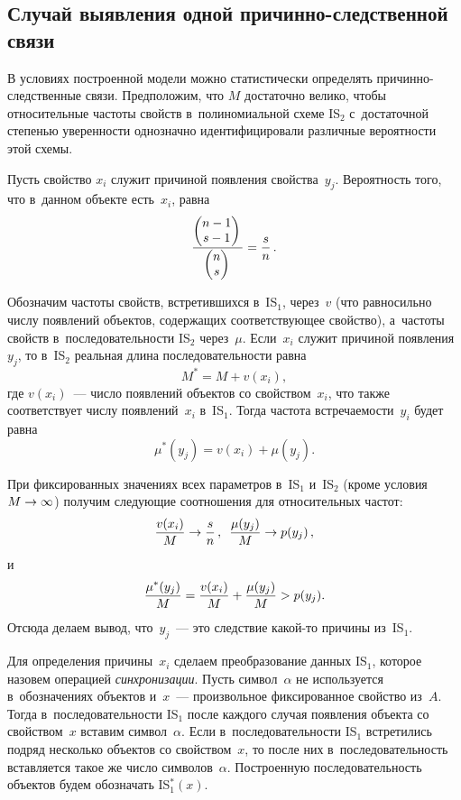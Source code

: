 \begin{multicols}{2}
  
  \section{Случай выявления одной причинно-следственной связи}
  
  В условиях построенной модели можно статистически определять при\-чин\-но-след\-ст\-вен\-ные 
  связи. Предположим, что $M$ достаточно велико, чтобы 
относительные частоты свойств в~полиномиальной схеме IS$_2$ с~достаточной 
степенью уверенности однозначно идентифицировали различные вероятности 
этой схемы. 
  
  Пусть свойство $x_i$ служит причиной появления свойства~$y_j$. Вероятность 
того, что в~данном объекте есть~$x_i$, равна 
  $$
  \displaystyle\frac{\displaystyle \begin{pmatrix}
  n-1\\ s-1
  \end{pmatrix}\mathstrut}{\displaystyle \begin{pmatrix}
  n\\ s
  \end{pmatrix}\mathstrut} =\displaystyle\frac{\displaystyle s\mathstrut}{\displaystyle n\mathstrut}\,.
  $$
  
  Обозначим частоты свойств, встретившихся в~IS$_1$, через~$v$  (что 
равносильно числу появлений объектов, содержащих соответствующее свойство), 
а~частоты свойств  в~последовательности IS$_2$ через~$\mu$. Если~$x_i$ служит 
причиной появления~$y_j$, то в~IS$_2$ реальная длина последовательности равна 
$$
M^*= M+ v(x_i),
$$
 где $v(x_i)$~--- число появлений объектов со 
свойством~$x_i$, что также соответствует числу появлений~$x_i$ в~IS$_1$. 
Тогда частота встречаемости~$y_i$ будет равна 
$$
\mu^*(y_j) = v(x_i) +  \mu(y_j).
$$

 При фиксированных значениях всех па\-ра\-мет\-ров в~IS$_1$ и~IS$_2$ 
(кроме условия  $M\hm\to \infty$) получим сле\-ду\-ющие соотношения для 
относительных час\-тот:
  $$
  \displaystyle\frac{\displaystyle v(x_i)\mathstrut}{\displaystyle M\mathstrut} \to \displaystyle\frac{\displaystyle s\mathstrut}{\displaystyle n\mathstrut}\,,\enskip \displaystyle\frac{\displaystyle \mu(y_j)\mathstrut}{\displaystyle M\mathstrut}\to p(y_j)\,,
  $$
и
$$
\displaystyle\frac{\displaystyle \mu^*(y_j)\mathstrut}{\displaystyle M\mathstrut}=\displaystyle\frac{\displaystyle v(x_i)\mathstrut}{\displaystyle M\mathstrut} +\displaystyle\frac{\displaystyle \mu(y_j)\mathstrut}{\displaystyle M\mathstrut} > p(y_j).
$$
  Отсюда делаем вывод, что~$y_j$~--- это следствие ка\-кой-то причины 
из~IS$_1$.
  
  Для определения причины~$x_i$ сделаем преобразование данных IS$_1$, 
которое назовем операцией \textit{синхронизации}. Пусть символ~$\alpha$ не 
используется в~обозначениях объектов и~$x$~--- произвольное фиксированное 
свойство из~$A$. Тогда в~последовательности IS$_1$ после каждого случая 
появления объекта со свойством~$x$ вставим символ~$\alpha$. Если 
в~последовательности IS$_1$ встретились подряд несколько объектов со 
свойством~$x$, то после них в~последовательность вставляется такое же число 
символов~$\alpha$. Построенную последовательность объектов будем обозначать 
IS$_1^*(x)$.
  

\end{multicols}

